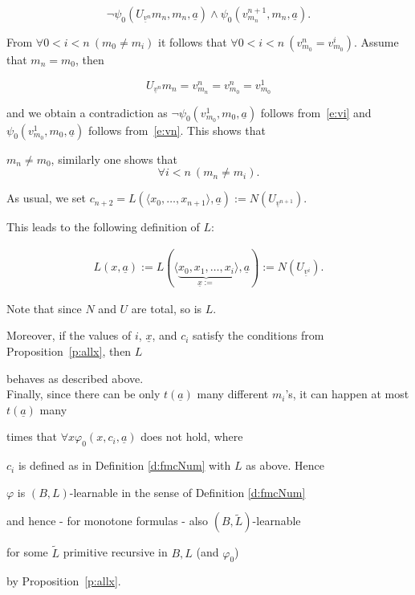 \documentclass[1p]{elsarticle}
\newcommand{\tup}{\underline} %
\theoremstyle{plain}
\theoremstyle{definition}
\theoremstyle{remark}
\renewenvironment{proof}[1][]{\noindent{\bf Proof{#1}. }}{\nopagebreak[4]{\hspace*{\fill}


  $\Box$              %

 }{\vspace{2ex}}}
\renewcommand{\phi}{\varphi}
\theoremstyle{definition}
\begin{document}
{\begin{proof}
\begin{enumerate}
\[ \neg\psi_0(U_{\tup v^n}m_n,m_n,\tup a) \wedge \psi_0(v^{n+1}_{m_n},m_n,\tup a). \tag{vn}\label{e:vn}\]

From $\forall 0<i<n\ ( m_0\neq m_i )$ it follows that $\forall0<i<n\ ( v^n_{m_0}=v^i_{m_0})$. Assume that $m_n = m_0$, then

\[U_{\tup v^n}m_n=v^n_{m_n}=v^n_{m_0}=v^1_{m_0}\]

and we obtain a contradiction as $\neg\psi_0(v^1_{m_0},m_0,\tup a)$ follows from~\eqref{e:vi} and $\psi_0(v^1_{m_0},m_0,\tup a)$ follows from~\eqref{e:vn}. This shows that 

$m_n \neq m_0$, similarly one shows that \[ \forall i<n\ (m_n \neq m_i).\]

As usual, we set $c_{n+2}=L(\langle x_0,\ldots,x_{n+1}\rangle,\tup a):=

N(U_{\tup v^{n+1}})$.

\end{enumerate}

This leads to the following definition of $L$:

\begin{align*}

 L(x,\tup a):= 

 L(\langle \underbrace {x_0,x_1,\ldots,x_i}_{\tup x:=}\rangle,\tup a):=

N(U_{\tup v^{i}}). 

\end{align*}

Note that since $N$ and $U$ are total, so is $L$. 

Moreover, if the values of $i$, $\tup x$, and $c_i$ satisfy the conditions from Proposition~\ref{p:allx}, then $L$ 

behaves as described above.\\

Finally, since there can be only $t(\tup a)$ many different $m_i$'s, it can happen at most $t(\tup a)$ many 

times that $\forall x \phi_0(x,c_i,\tup a)$ does not hold, where

$c_i$ is defined as in Definition \ref{d:fmcNum} with $L$ as above. Hence 

$\varphi$ is $(B,L)$-learnable in the sense of  Definition \ref{d:fmcNum} 

and hence - for monotone formulas - also $(B,\tilde{L})$-learnable 

for some $\tilde{L}$ primitive recursive in $B,L$ (and $\varphi_0$) 

by Proposition~\ref{p:allx}. 


\end{proof}}
\end{document}
